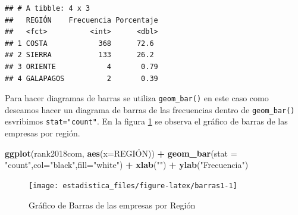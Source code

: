 \documentclass[]{book}
\newenvironment{Shaded}{\begin{snugshade}}{\end{snugshade}}
\newcommand{\DataTypeTok}[1]{\textcolor[rgb]{0.13,0.29,0.53}{#1}}
\newcommand{\DecValTok}[1]{\textcolor[rgb]{0.00,0.00,0.81}{#1}}
\newcommand{\KeywordTok}[1]{\textcolor[rgb]{0.13,0.29,0.53}{\textbf{#1}}}
\newcommand{\NormalTok}[1]{#1}
\newcommand{\OperatorTok}[1]{\textcolor[rgb]{0.81,0.36,0.00}{\textbf{#1}}}
\newcommand{\StringTok}[1]{\textcolor[rgb]{0.31,0.60,0.02}{#1}}
\begin{document}
\begin{Shaded}
\end{Shaded}

\begin{verbatim}
## # A tibble: 4 x 3
##   REGIÓN    Frecuencia Porcentaje
##   <fct>          <int>      <dbl>
## 1 COSTA            368      72.6 
## 2 SIERRA           133      26.2 
## 3 ORIENTE            4       0.79
## 4 GALAPAGOS          2       0.39
\end{verbatim}

Para hacer diagramas de barras se utiliza \texttt{geom\_bar()} en este caso como deseamos hacer un diagrama de barras de las frecuencias dentro de \texttt{geom\_bar()} esvribimos \texttt{stat="count"}. En la figura \ref{fig:barras1} se observa el gráfico de barras de las empresas por región.

\begin{Shaded}
\begin{Highlighting}[]
\KeywordTok{ggplot}\NormalTok{(rank2018com, }\KeywordTok{aes}\NormalTok{(}\DataTypeTok{x=}\NormalTok{REGIÓN)) }\OperatorTok{+}\StringTok{ }
\StringTok{  }\KeywordTok{geom_bar}\NormalTok{(}\DataTypeTok{stat =} \StringTok{"count"}\NormalTok{,}\DataTypeTok{col=}\StringTok{"black"}\NormalTok{,}\DataTypeTok{fill=}\StringTok{"white"}\NormalTok{) }\OperatorTok{+}
\StringTok{  }\KeywordTok{xlab}\NormalTok{(}\StringTok{""}\NormalTok{) }\OperatorTok{+}\StringTok{ }\KeywordTok{ylab}\NormalTok{(}\StringTok{"Frecuencia"}\NormalTok{)}
\end{Highlighting}
\end{Shaded}

\begin{figure}[h!]

{\centering \texttt{[image: estadistica\_files/figure-latex/barras1-1]} 

}

\caption{Gráfico de Barras de las empresas por Región}\label{fig:barras1}
\end{figure}
\end{document}
